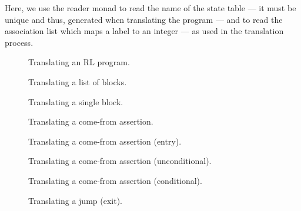 \noindent Here, we use the reader monad to read the name of the state table --- it must be unique and thus, generated when translating the program --- and to read the association list which maps a label to an integer --- as used in the translation process.

\begin{figure}[H]
  
  \caption{Translating an RL program.}\label{fig:rltrlProg}
\end{figure}

\begin{figure}[H]
  
  \caption{Translating a list of blocks.}\label{fig:rltrlBlks}
\end{figure}

\begin{figure}[H]
  
  \caption{Translating a single block.}\label{fig:rltrlBlk}
\end{figure}

\begin{figure}[H]
  
  \caption{Translating a come-from assertion.}\label{fig:rltrlFromEntry}
\end{figure}

\begin{figure}[H]
  
  \caption{Translating a come-from assertion (entry).}\label{fig:rltrlFromEntry}
\end{figure}

\begin{figure}[H]
  
  \caption{Translating a come-from assertion (unconditional).}\label{fig:rltrlFromFrom}
\end{figure}

\begin{figure}[H]
  
  \caption{Translating a come-from assertion (conditional).}\label{fig:rltrlFromFi}
\end{figure}

\begin{figure}[H]
  
  \caption{Translating a jump (exit).}\label{fig:rltrlJumpExit}
\end{figure}

